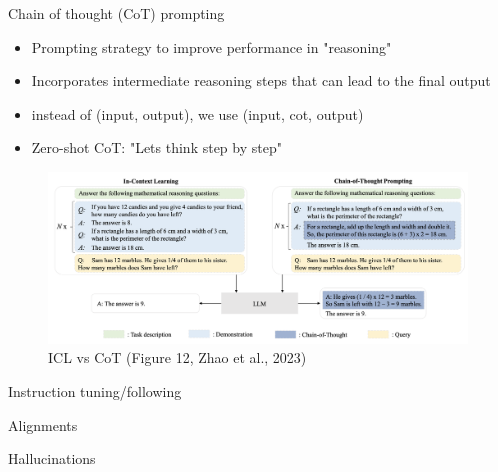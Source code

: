 \documentclass[10pt]{beamer}
\begin{document}
\begin{frame}{Chain of thought (CoT) prompting}


\begin{itemize}
\item Prompting strategy to improve performance in "reasoning"
\item Incorporates intermediate reasoning steps that can lead to the final output
\item instead of (input, output), we use (input, cot, output)
\item Zero-shot CoT: "Lets think step by step"
\end{itemize}

\begin{figure}[h]
\centering
\includegraphics[width=0.99\textwidth]{fig/zhao_2023_fig12}
\caption{ICL vs CoT (Figure 12, Zhao et al., 2023)}
\end{figure}

\end{frame}

\begin{frame}{Instruction tuning/following}


\end{frame}


\begin{frame}{Alignments}


\end{frame}


\begin{frame}{Hallucinations}



%

\end{frame}
\end{document}
